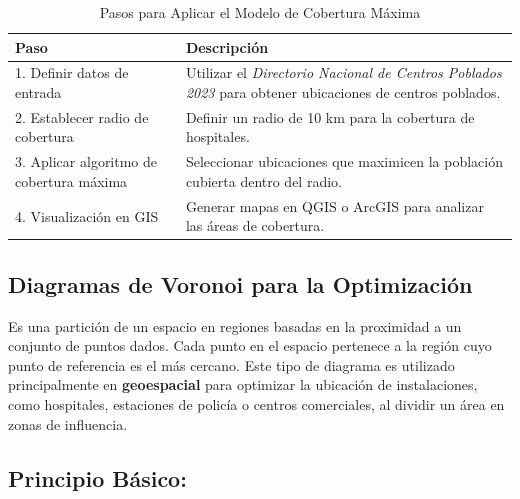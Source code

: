 \documentclass{article}
\begin{document}
\begin{itemize}
	
	\begin{table}[H]
		\centering
		\caption{Pasos para Aplicar el Modelo de Cobertura Máxima}
		\begin{tabularx}{\textwidth}{|l|X|}
			\hline
			\textbf{Paso} & \textbf{Descripción} \\
			\hline
			1. Definir datos de entrada & Utilizar el \textit{Directorio Nacional de Centros Poblados 2023} para obtener ubicaciones de centros poblados. \\
			\hline
			2. Establecer radio de cobertura & Definir un radio de 10 km para la cobertura de hospitales. \\
			\hline
			3. Aplicar algoritmo de cobertura máxima & Seleccionar ubicaciones que maximicen la población cubierta dentro del radio. \\
			\hline
			4. Visualización en GIS & Generar mapas en QGIS o ArcGIS para analizar las áreas de cobertura. \\
			\hline
		\end{tabularx}
		\label{tab:mclp_pasos}
	\end{table}
	
	\subsection*{Diagramas de Voronoi para la Optimización}
	
	Es una partición de un espacio en regiones basadas en la proximidad a un conjunto de puntos dados. Cada punto en el espacio pertenece a la región cuyo punto de referencia es el más cercano. Este tipo de diagrama es utilizado principalmente en \textbf{geoespacial} para optimizar la ubicación de instalaciones, como hospitales, estaciones de policía o centros comerciales, al dividir un área en zonas de influencia.
\end{itemize}

\subsection*{\small Principio Básico:}
\end{document}
